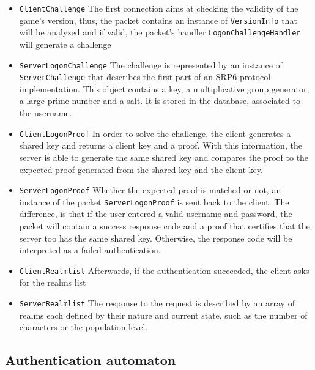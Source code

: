 \documentclass[paper=a4, fontsize=11pt]{scrartcl}
\begin{document}
\begin{itemize}
    \item \texttt{ClientChallenge}
        The first connection aims at checking the validity of the game's version, 
        thus, the packet contains an instance of \texttt{VersionInfo} that will 
        be analyzed and if valid, the packet's handler
        \texttt{LogonChallengeHandler} will generate a challenge

    \item \texttt{ServerLogonChallenge}
        The challenge is represented by an instance of \texttt{ServerChallenge}
        that describes the first part of an SRP6 protocol implementation. This
        object contains a key, a multiplicative group generator, a large
        prime number and a salt. It is stored in the database, associated to the
        username.

    \item \texttt{ClientLogonProof}
        In order to solve the challenge, the client generates a shared key and
        returns a client key and a proof. With this information, the server is
        able to generate the same shared key and compares the proof to the
        expected proof generated from the shared key and the client key. 

    \item \texttt{ServerLogonProof}
        Whether the expected proof is matched or not, an instance of the packet 
        \texttt{ServerLogonProof} is sent back to the client. The difference, 
        is that if the user entered a valid username and password, the packet 
        will contain a success response code and a proof that certifies that the 
        server too has the same shared key. Otherwise, the response code will be 
        interpreted as a failed authentication.

    \item \texttt{ClientRealmlist}
        Afterwards, if the authentication succeeded, the client asks for the
        realms list

    \item \texttt{ServerRealmlist}
        The response to the request is described by an array of realms each
        defined by their nature and current state, such as the number of
        characters or the population level.

\end{itemize}

\subsection{Authentication automaton}
\end{document}
